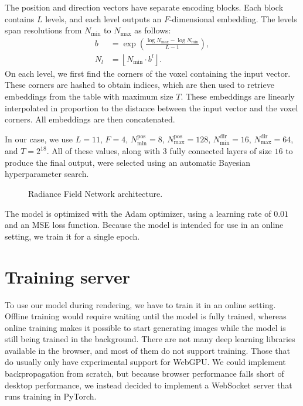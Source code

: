 The position and direction vectors have separate encoding blocks. Each block
contains $L$ levels, and each level outputs an $F$-dimensional embedding. The
levels span resolutions from $N_{\min}$ to $N_{\max}$ as follows:
\begin{align}
    b &= \exp\left( \frac{\log N_{\max} - \log N_{\min}}{L - 1} \right), \\ 
    N_l &= \left\lfloor N_{\min} \cdot b^l \right\rfloor.
\end{align}
On each level, we first find the corners of the voxel containing the input
vector. These corners are hashed to obtain indices, which are then used to
retrieve embeddings from the table with maximum size $T$. These embeddings are
linearly interpolated in proportion to the distance between the input vector
and the voxel corners. All embeddings are then concatenated.

In our case, we use
$L = 11$,
$F = 4$,
$N_{\min}^{\text{pos}} = 8$, $N_{\max}^{\text{pos}} = 128$,
$N_{\min}^{\text{dir}} = 16$, $N_{\max}^{\text{dir}} = 64$,
and $T = 2^{18}$. All of these values, along with $3$ fully connected layers
of size $16$ to produce the final output, were selected using an automatic 
Bayesian hyperparameter search.

\begin{figure}[t]
    \centering
    
    \caption{Radiance Field Network architecture.}
    \label{fig:arch}
\end{figure}

The model is optimized with the Adam optimizer, using a learning rate of $0.01$
and an MSE loss function. Because the model is intended for use in an online
setting, we train it for a single epoch.

\section{Training server}

To use our model during rendering, we have to train it in an online setting.
Offline training would require waiting until the model is fully trained, whereas
online training makes it possible to start generating images while the model is
still being trained in the background. There are not many deep learning libraries
available in the browser, and most of them do not support training. Those that do 
usually only have experimental support for WebGPU. We could implement 
backpropagation from scratch, but because browser performance falls short of 
desktop performance, we instead decided to implement a WebSocket server that runs
training in PyTorch.

